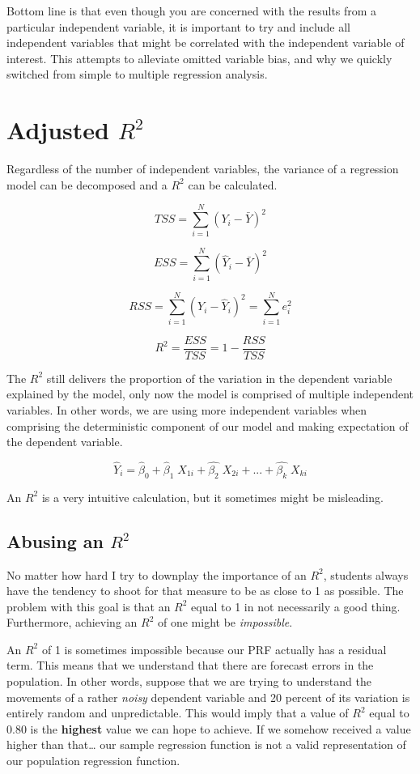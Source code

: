 \documentclass[
]{book}
\begin{document}
Bottom line is that even though you are concerned with the results from a particular independent variable, it is important to try and include all independent variables that might be correlated with the independent variable of interest. This attempts to alleviate omitted variable bias, and why we quickly switched from simple to multiple regression analysis.

\section{\texorpdfstring{Adjusted \(R^2\)}{Adjusted R\^{}2}}\label{adjusted-r2}

Regardless of the number of independent variables, the variance of a regression model can be decomposed and a \(R^2\) can be calculated.

\[TSS = \sum^{N}_{i=1}(Y_i - \bar{Y})^2\]

\[ESS = \sum^{N}_{i=1}(\hat{Y}_i - \bar{Y})^2\]

\[RSS = \sum^{N}_{i=1}(Y_i - \hat{Y}_i)^2 = \sum^{N}_{i=1}e_i^2\]

\[R^2 = \frac{ESS}{TSS} = 1 - \frac{RSS}{TSS}\]

The \(R^2\) still delivers the proportion of the variation in the dependent variable explained by the model, only now the model is comprised of multiple independent variables. In other words, we are using more independent variables when comprising the deterministic component of our model and making expectation of the dependent variable.

\[\hat{Y}_i = \hat{\beta}_0+\hat{\beta}_1\;X_{1i}+\hat{\beta_2}\;X_{2i}+...+\hat{\beta_k}\;X_{ki}\]

An \(R^2\) is a very intuitive calculation, but it sometimes might be misleading.

\subsection{\texorpdfstring{Abusing an \(R^2\)}{Abusing an R\^{}2}}\label{abusing-an-r2}

No matter how hard I try to downplay the importance of an \(R^2\), students always have the tendency to shoot for that measure to be as close to 1 as possible. The problem with this goal is that an \(R^2\) equal to 1 in not necessarily a good thing. Furthermore, achieving an \(R^2\) of one might be \emph{impossible}.

An \(R^2\) of 1 is sometimes impossible because our PRF actually has a residual term. This means that we understand that there are forecast errors in the population. In other words, suppose that we are trying to understand the movements of a rather \emph{noisy} dependent variable and 20 percent of its variation is entirely random and unpredictable. This would imply that a value of \(R^2\) equal to \(0.80\) is the \textbf{highest} value we can hope to achieve. If we somehow received a value higher than that\ldots{} our sample regression function is not a valid representation of our population regression function.
\end{document}
